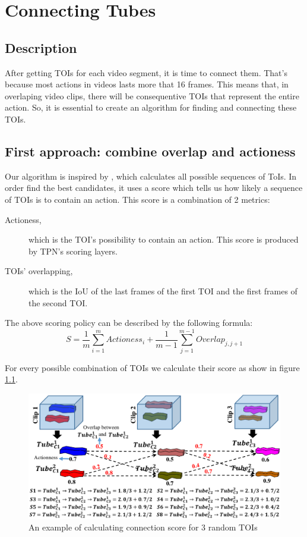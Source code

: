 \documentclass{report}
\begin{document}
\chapter{Connecting Tubes}
\section{Description}
After getting TOIs for each video segment, it is time to connect them. That's because most actions in videos lasts more that 16 frames.
This means that, in overlaping video clips, there will be consequentive TOIs that represent the entire action. So, it is essential to create
an algorithm for finding and connecting these TOIs.

\section{First approach: combine overlap and actioness}
Our algorithm is inspired by \cite{DBLP:journals/corr/HouCS17}, which calculates all possible sequences of ToIs. In order find the best candidates,
it uses a score which tells us how likely a sequence of TOIs is  to contain an action. This score is a combination of 2 metrics:
\begin{description}
\item[ Actioness,  ] which is the TOI's possibility to contain an action. This score is produced by TPN's scoring layers.
\item [ TOIs' overlapping, ] which is the IoU of the last frames of the first TOI and the first frames of the second TOI.
\end{description}

The above scoring policy can be described by the following formula:
\[ S = \frac{1}{m} \sum_ {i=1}^{m} Actioness_i + \frac{1}{m-1} \sum_{j=1}^{m-1} Overlap_{j,j+1} \]

For every possible combination of TOIs we calculate their score as show in figure \ref{fig:connection_algo}.

\begin{figure}[h]
  \centering
  \includegraphics[scale=0.225]{connection_algo}
  \caption{An example of calculating connection score for 3 random TOIs}
  \label{fig:connection_algo}
\end{figure}
\end{document}
